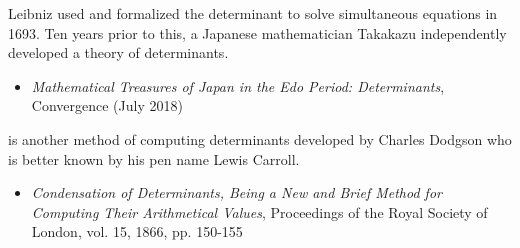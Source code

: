\documentclass{ximera}
\begin{document}
Leibniz used and formalized the determinant to solve simultaneous
equations in 1693. Ten years prior to this, a Japanese mathematician
Takakazu independently developed a theory of determinants.
\begin{itemize}
\item
  \textit{Mathematical Treasures of Japan in the Edo
    Period: Determinants}, Convergence (July 2018)
\end{itemize}

 is another method of computing determinants
developed by Charles Dodgson who is better known by his pen name Lewis
Carroll.
\begin{itemize}
\item
  \textit{Condensation of Determinants, Being a New and Brief Method
    for Computing Their Arithmetical Values}, Proceedings of the Royal
  Society of London, vol. 15, 1866, pp. 150-155
\end{itemize}
\end{document}
